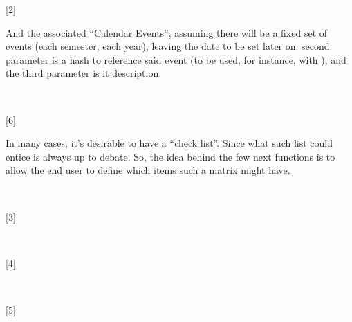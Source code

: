 \documentclass[10pt]{article}
\begin{document}
[2]

And the associated ``Calendar Events'', assuming there will be a fixed set of events (each semester, each year), leaving the date to be set later on. \tsobj{\ActivitySetNewEvent} second parameter  is a hash to reference said event (to be used, for instance, with \tsobj{\ActivitySetEventDay}), and the third parameter is it description.

~

[6]


In many cases, it's desirable to have a ``check list''. Since what such list could entice is always up to debate. So, the idea behind the few next functions is to allow the end user to define which items such a matrix might have.


~

[3]

~

[4]

~

[5]
\end{document}
